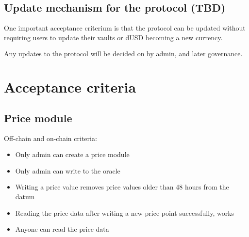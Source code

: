 \documentclass{article} %
\begin{document}






\subsection{Update mechanism for the protocol (TBD)}

One important acceptance criterium is that the protocol can be updated without
requiring users to update their vaults or dUSD becoming a new currency.

Any updates to the protocol will be decided on by admin, and later governance.

\section{Acceptance criteria}

\subsection{Price module}

Off-chain and on-chain criteria:
\begin{itemize}
  \item Only admin can create a price module
  \item Only admin can write to the oracle
  \item Writing a price value removes price values older than 48 hours from the
    datum
  \item Reading the price data after writing a new price point successfully,
    works
  \item Anyone can read the price data
\end{itemize}
\end{document}
